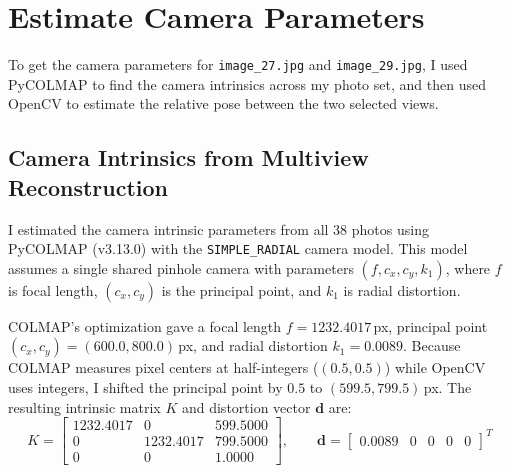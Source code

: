 \documentclass[12pt]{article}
\begin{document}
\section{Estimate Camera Parameters}\label{sec:camera_params}


To get the camera parameters for \texttt{image\_27.jpg} and \texttt{image\_29.jpg}, I used PyCOLMAP to find the camera intrinsics across my photo set, and then used OpenCV to estimate the relative pose between the two selected views.

\subsection{Camera Intrinsics from Multiview Reconstruction}
I estimated the camera intrinsic parameters from all 38 photos using PyCOLMAP (v3.13.0) with the \texttt{SIMPLE\_RADIAL} camera model. This model assumes a single shared pinhole camera with parameters $(f, c_x, c_y, k_1)$, where $f$ is focal length, $(c_x, c_y)$ is the principal point, and $k_1$ is radial distortion.

COLMAP's optimization gave a focal length $f = 1232.4017$\,px, principal point $(c_x, c_y) = (600.0, 800.0)$\,px, and radial distortion $k_1 = 0.0089$. Because COLMAP measures pixel centers at half-integers ($(0.5, 0.5)$) while OpenCV uses integers, I shifted the principal point by $0.5$ to $(599.5, 799.5)$\,px. The resulting intrinsic matrix $K$ and distortion vector $\mathbf{d}$ are:
\begin{equation}
K = \begin{bmatrix}
1232.4017 & 0 & 599.5000 \\
0 & 1232.4017 & 799.5000 \\
0 & 0 & 1.0000
\end{bmatrix}, \qquad
\mathbf{d} = \begin{bmatrix} 0.0089 & 0 & 0 & 0 & 0 \end{bmatrix}^T
\label{eq:intrinsics}
\end{equation}
\end{document}
